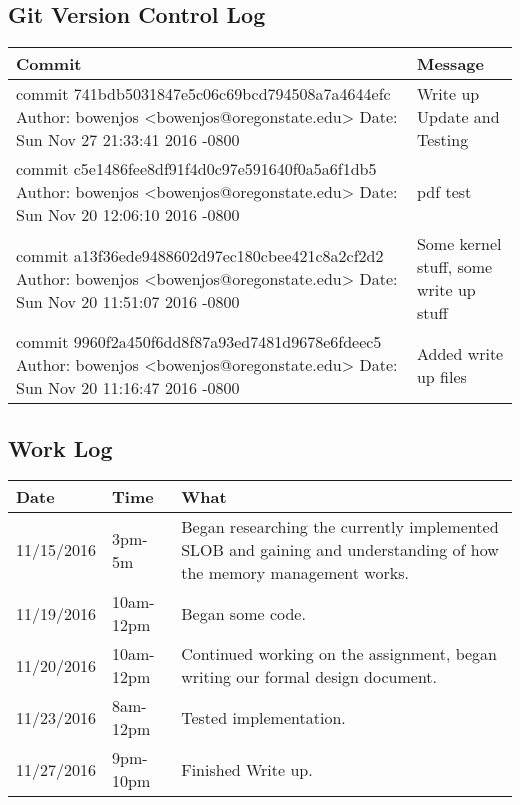 \documentclass[letterpaper,10pt,titlepage]{article}
\begin{document}
\subsection {Git Version Control Log}
\begin{tabular}{ |p{10cm}|p{3cm}| } 
 \hline
 Commit & Message \\
 \hline
commit 741bdb5031847e5c06c69bcd794508a7a4644efc
Author: bowenjos <bowenjos@oregonstate.edu>
Date:   Sun Nov 27 21:33:41 2016 -0800
&
    Write up Update and Testing\\

\hline
commit c5e1486fee8df91f4d0c97e591640f0a5a6f1db5
Author: bowenjos <bowenjos@oregonstate.edu>
Date:   Sun Nov 20 12:06:10 2016 -0800
&
    pdf test\\
\hline

commit a13f36ede9488602d97ec180cbee421c8a2cf2d2
Author: bowenjos <bowenjos@oregonstate.edu>
Date:   Sun Nov 20 11:51:07 2016 -0800
&
    Some kernel stuff, some write up stuff\\
\hline

commit 9960f2a450f6dd8f87a93ed7481d9678e6fdeec5
Author: bowenjos <bowenjos@oregonstate.edu>
Date:   Sun Nov 20 11:16:47 2016 -0800
&
    Added write up files\\
\hline

\end{tabular}

\subsection{Work Log}
\begin{tabular}{ |p{3cm}|p{3cm}|p{5cm}| } 
\hline
Date & Time & What \\
\hline
11/15/2016& 3pm-5m& Began researching the currently implemented SLOB and gaining and understanding of how the memory management works. \\
 \hline
 11/19/2016& 10am-12pm& Began some code. \\
 \hline
 11/20/2016& 10am-12pm & Continued working on the assignment, began writing our formal design document.\\
 \hline
 11/23/2016& 8am-12pm & Tested implementation.\\
 \hline
 11/27/2016& 9pm-10pm & Finished Write up.\\
 \hline
\end{tabular}
\end{document}
